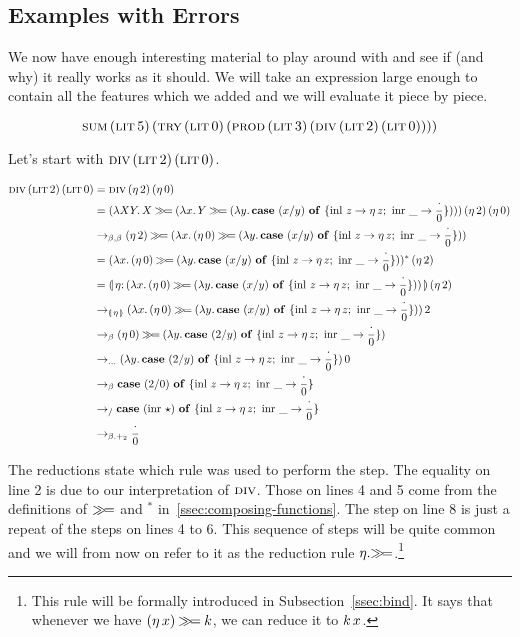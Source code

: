 \subsection{Examples with Errors}

We now have enough interesting material to play around with and see if (and
why) it really works as it should. We will take an expression large enough
to contain all the features which we added and we will evaluate it piece by
piece.

$$
\textsc{sum}\,(\textsc{lit}\,5)\,(\textsc{try}\,(\textsc{lit}\,0)\,(\textsc{prod}\,(\textsc{lit}\,3)\,(\textsc{div}\,(\textsc{lit}\,2)\,(\textsc{lit}\,0))))
$$

Let's start with $\textsc{div}\,(\textsc{lit}\,2)\,(\textsc{lit}\,0)$.

\NoChapterPrefix
\begin{align}
  \app{\dive}{\litec{2}}{\litec{0}}
  &= \app{\dive}{(\ap{\eta}{2})}
                {(\ap{\eta}{0})} \\
  &= \app{(\lam{X Y}{X \hsbind (\lam{x}{Y \hsbind (\lam{y}
          {\case{(x / y)}{z}{\ap{\eta}{z}}{\_}{\dbze}})})})}
                {(\ap{\eta}{2})} {(\ap{\eta}{0})} \\
  &\to_{\beta,\beta} (\ap{\eta}{2}) \hsbind (\lam{x}{(\ap{\eta}{0}) \hsbind (\lam{y}
          {\case{(x / y)}{z}{\ap{\eta}{z}}{\_}{\dbze}})}) \\
  &= \ap{(\lam{x}{(\ap{\eta}{0}) \hsbind (\lam{y}
          {\case{(x / y)}{z}{\ap{\eta}{z}}{\_}{\dbze}})})^*}{(\ap{\eta}{2})} \\
  &= \ap{\banana{\onto{\eta}{(\lam{x}{(\ap{\eta}{0}) \hsbind (\lam{y}
          {\case{(x / y)}{z}{\ap{\eta}{z}}{\_}{\dbze}})})}}}{(\ap{\eta}{2})} \\
  &\to_{\banana{\eta}} \ap{(\lam{x}{(\ap{\eta}{0}) \hsbind (\lam{y}
          {\case{(x / y)}{z}{\ap{\eta}{z}}{\_}{\dbze}})})}{2} \\
  &\to_{\beta} (\ap{\eta}{0}) \hsbind (\lam{y}
          {\case{(2 / y)}{z}{\ap{\eta}{z}}{\_}{\dbze}}) \\
  &\to_{\ldots} \ap{(\lam{y}{\case{(2 / y)}{z}{\ap{\eta}{z}}{\_}{\dbze}})}{0} \\
  &\to_{\beta} \case{(2 / 0)}{z}{\ap{\eta}{z}}{\_}{\dbze} \\
  &\to_{/} \case{(\ap{\inr}{\star})}{z}{\ap{\eta}{z}}{\_}{\dbze} \\
  &\to_{\beta.+_2} \dbze
\end{align}
\setcounter{equation}{0}
\ChapterPrefix

The reductions state which rule was used to perform the step. The equality
on line 2 is due to our interpretation of $\textsc{div}$. Those on lines 4 and 5
come from the definitions of $\mathbin{\gg\!=}$ and $^*$
in~\ref{ssec:composing-functions}. The step on line 8 is just a repeat of
the steps on lines 4 to 6. This sequence of steps will be quite common and
we will from now on refer to it as the reduction rule
$\eta.\mathbin{\gg\!=}$.\footnote{This rule will be formally introduced
  in Subsection~\ref{ssec:bind}. It says that whenever we have
  $(\eta\,x) \mathbin{\gg\!=} k$, we can reduce it to $k\,x$.}

